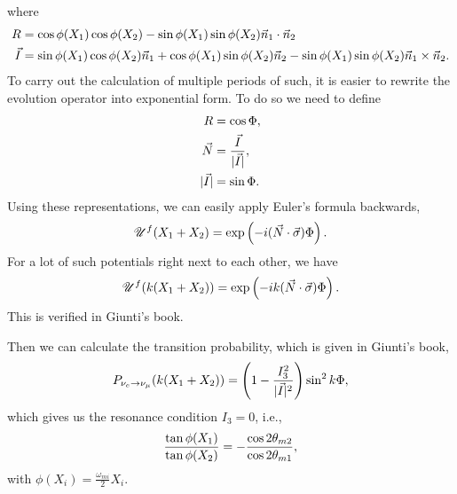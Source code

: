 \documentclass[letterpaper,12pt,english]{sphinxmanual}
\begin{document}
where
\begin{gather}
\begin{split}R &= \cos \phi(X_1) \cos \phi(X_2) - \sin \phi(X_1)\sin \phi(X_2) \vec n_1\cdot \vec n_2 \\
\vec I & = \sin \phi(X_1) \cos \phi(X_2) \vec n_1 + \cos \phi(X_1) \sin \phi(X_2) \vec n_2 -  \sin \phi (X_1) \sin \phi(X_2) \vec n_1 \times \vec n_2.\end{split}\notag
\end{gather}
To carry out the calculation of multiple periods of such, it is easier to rewrite the evolution operator into exponential form. To do so we need to define
\begin{gather}
\begin{split}R & = \cos \Phi ,\\
\vec N & = \frac{\vec I}{\lvert \vec I \rvert},\\
\lvert \vec I \rvert & = \sin \Phi.\end{split}\notag
\end{gather}
Using these representations, we can easily apply Euler's formula backwards,
\begin{gather}
\begin{split}\mathscr{U}^f(X_1+X_2) = \exp \left( -i (\vec N \cdot  \vec \sigma) \Phi \right).\end{split}\notag
\end{gather}
For a lot of such potentials right next to each other, we have
\begin{gather}
\begin{split}\mathscr{U}^f(k(X_1+X_2)) = \exp \left( -i k (\vec N \cdot  \vec \sigma) \Phi \right).\end{split}\notag
\end{gather}
This is verified in Giunti's book.

Then we can calculate the transition probability, which is given in Giunti's book,
\begin{gather}
\begin{split}P_{\nu_e\to\nu_\mu} (k(X_1+X_2) ) = \left( 1 - \frac{I_3^2}{\lvert \vec I \rvert^2}  \right) \sin^2 k\Phi ,\end{split}\notag
\end{gather}
which gives us the resonance condition \(I_3=0\), i.e.,
\begin{gather}
\begin{split}\frac{\tan \phi(X_1)}{\tan \phi(X_2)} = -\frac{\cos 2\theta_{m2}}{\cos 2\theta_{m1}},\end{split}\notag
\end{gather}
with \(\phi(X_i)=\frac{\omega_{mi}}{2}X_i\).
\end{document}
